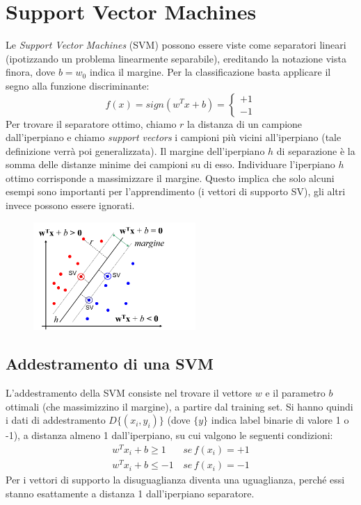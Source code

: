 \documentclass[a4paper,oneside,titlepage]{book}
\begin{document}
\section{Support Vector Machines}
Le \textit{Support Vector Machines} (SVM) possono essere viste come separatori lineari (ipotizzando un problema linearmente separabile), ereditando la notazione vista finora, dove $b=w_0$ indica il margine. Per la classificazione basta applicare il segno alla funzione discriminante:
\[ f(x) = sign(w^T x + b) =
    \begin{cases}
        +1 \\
        -1
    \end{cases} \]
Per trovare il separatore ottimo, chiamo $r$ la distanza di un campione dall'iperpiano e chiamo \textit{support vectors} i campioni più vicini all'iperpiano (tale definizione verrà poi generalizzata). Il margine dell'iperpiano $h$ di separazione è la somma delle distanze minime dei campioni su di esso. Individuare l’iperpiano $h$ ottimo corrisponde a massimizzare il margine. Questo implica che solo alcuni esempi sono importanti per l'apprendimento (i vettori di supporto SV), gli altri invece possono essere ignorati.
\begin{figure}[htp]
	\centering
	\includegraphics[width=0.55\textwidth]{svm4.png}
\end{figure}

\subsection{Addestramento di una SVM}
L'addestramento della SVM consiste nel trovare il vettore $w$ e il parametro $b$ ottimali (che massimizzino il margine), a partire dal training set. Si hanno quindi i dati di addestramento $D \{(x_i, y_i) \}$ (dove $\{y\}$ indica label binarie di valore 1 o -1), a distanza almeno 1 dall'iperpiano, su cui valgono le seguenti condizioni:
\begin{align*}
    w^T x_i + b \geq 1 \, &se \, f(x_i)=+1 \\
    w^T x_i + b \leq -1 \, &se \, f(x_i)=-1
\end{align*}
Per i vettori di supporto la disuguaglianza diventa una uguaglianza, perché essi stanno esattamente a distanza 1 dall'iperpiano separatore.
\end{document}

